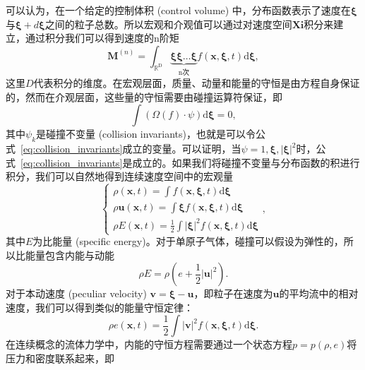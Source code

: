 可以认为，在一个给定的控制体积 (control volume) 中，分布函数表示了速度在$\boldsymbol{\xi}$与$\boldsymbol{\xi}+d\boldsymbol{\xi}$之间的粒子总数。所以宏观和介观值可以通过对速度空间$\boldsymbol{Xi}$积分来建立，通过积分我们可以得到速度的n阶矩
\begin{equation}
    \boldsymbol{M}^{(n)}=\int_{\mathbb{R}^{\mathrm{D}}} \underbrace{\boldsymbol{\xi} \boldsymbol{\xi} \ldots \boldsymbol{\xi}}_{\mathrm{n} \text {次}} f(\boldsymbol{x}, \boldsymbol{\xi}, t) \mathrm{d} \boldsymbol{\xi},
\end{equation}
这里$D$代表积分的维度。在宏观层面，质量、动量和能量的守恒是由方程自身保证的，然而在介观层面，这些量的守恒需要由碰撞运算符保证，即
\begin{equation}
    \int\left(\Omega(f) \cdot \psi\right) \mathrm{d} \boldsymbol{\xi}=0,
    \label{eq:collision_invariants}
\end{equation}
其中$\psi_k$是碰撞不变量 (collision invariants)，也就是可以令公式~\ref{eq:collision_invariants}成立的变量。可以证明，当$\psi=1, \boldsymbol{\xi}, |\boldsymbol{\xi}|^2$时，公式~\ref{eq:collision_invariants}是成立的。如果我们将碰撞不变量与分布函数的积进行积分，我们可以自然地得到连续速度空间中的宏观量
\begin{equation}
    \left\{\begin{array}{l}\rho(\boldsymbol{x}, t)=\int f(\boldsymbol{x}, \boldsymbol{\xi}, t) \mathrm{d} \boldsymbol{\xi} \\ \rho \boldsymbol{u}(\boldsymbol{x}, t)=\int \boldsymbol{\xi} f(\boldsymbol{x}, \boldsymbol{\xi}, t) \mathrm{d} \boldsymbol{\xi} \\ \rho E(\boldsymbol{x}, t)=\frac{1}{2} \int|\boldsymbol{\xi}|^2 f(\boldsymbol{x}, \boldsymbol{\xi}, t) \mathrm{d} \boldsymbol{\xi}\end{array}\right.,
\end{equation}
其中$E$为比能量 (specific energy)。对于单原子气体，碰撞可以假设为弹性的，所以比能量包含内能与动能
\begin{equation}
    \rho E=\rho\left(e+\frac{1}{2}|\boldsymbol{u}|^2\right).
\end{equation}
对于本动速度 (peculiar velocity) $\boldsymbol{v}=\boldsymbol{\xi}-\boldsymbol{u}$，即粒子在速度为$\boldsymbol{u}$的平均流中的相对速度，我们可以得到类似的能量守恒定律：
\begin{equation}
    \rho e(\boldsymbol{x}, t)=\frac{1}{2} \int|\boldsymbol{v}|^2 f(\boldsymbol{x}, \boldsymbol{\xi}, t) \mathrm{d} \boldsymbol{\xi}.
\end{equation}
在连续概念的流体力学中，内能的守恒方程需要通过一个状态方程$p=p(\rho,e)$将压力和密度联系起来，即
